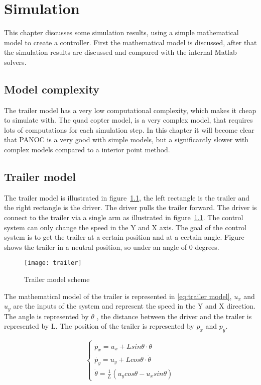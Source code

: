 \chapter{Simulation}
This chapter discusses some simulation results, using a simple mathematical model to create a controller. First the mathematical model is discussed, after that the simulation results are discussed and compared with the internal Matlab solvers.

\section{Model complexity}
The trailer model has a very low computational complexity, which makes it cheap to simulate with. The quad copter model, is a very complex model, that requires lots of computations for each simulation step. In this chapter it will become clear that PANOC is a very good with simple models, but a significantly slower with complex models compared to a interior point method.


\section{Trailer model}
The trailer model is illustrated in figure~\ref{fig:trailer model}, the left rectangle is the trailer and the right rectangle is the driver. The driver pulls the trailer forward. The driver is connect to the trailer via a single arm as illustrated in figure~\ref{fig:trailer model}. The control system can only change the speed in the Y and X axis. The goal of the control system is to get the trailer at a certain position and at a certain angle. Figure shows the trailer in a neutral position, so under an angle of 0 degrees.

\begin{figure}
	\centering
	\texttt{[image: trailer]}
	\caption{Trailer model scheme}
	\label{fig:trailer model}
\end{figure}

The mathematical model of the trailer is represented in \eqref{eq:trailer model}, $u_x$ and $u_y$ are the inputs of the system and represent the speed in the Y and X direction. The angle is represented by $\theta$ , the distance between the driver and the trailer is represented by L. The position of the trailer is represented by $p_x$ and $p_y$.

\begin{equation}
	\begin{cases}
		\dot{p_x} = u_x + L sin \theta \cdot \dot{\theta} \\
		\dot{p_y} = u_y + L cos \theta \cdot \dot{\theta} \\
		\dot{\theta} = \frac{1}{L}(u_ycos \theta - u_x sin \theta)	
	\end{cases}
	\label{eq:trailer model}
\end{equation}

